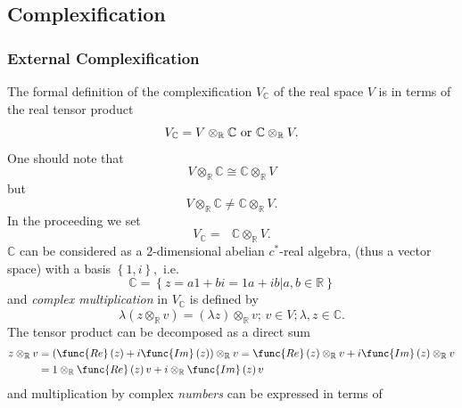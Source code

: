 \documentclass[aps,preprint]{revtex4}
\begin{document}
\subsection{Complexification \label{3/8/2026}}

\subsubsection{External Complexification}

The formal definition of the complexification $V_{\mathbb{C}}$ of the real
space $V$ is in terms of the real tensor product 
\begin{equation}
V_{\mathbb{C}}=V\otimes_{\mathbb{R}}\mathbb{C}\text{ or }\mathbb{C}\otimes_{%
\mathbb{R}}V.
\end{equation}
One should note that 
\begin{equation}
V\otimes_{\mathbb{R}}\mathbb{C\cong C}\otimes_{\mathbb{R}}V
\end{equation}
but 
\begin{equation}
V\otimes_{\mathbb{R}}\mathbb{C\neq C}\otimes_{\mathbb{R}}V.
\end{equation}
In the proceeding we set 
\begin{equation}
V_{\mathbb{C}}=\text{ }\mathbb{C}\otimes_{\mathbb{R}}V.
\end{equation}
$\mathbb{C}$ can be considered as a $2$-dimensional abelian $c^{\ast}$-real
algebra, (thus a vector space) with a basis $\left\{ 1,i\right\} ,$ i.e. 
\begin{equation}
\mathbb{C}=\left\{ \left. z=a1+bi=1a+ib\right\vert a,b\in\mathbb{R}\right\}
\end{equation}
and \emph{complex multiplication} in $V_{\mathbb{C}}$ is defined by%
\begin{equation}
\lambda\left( z\otimes_{\mathbb{R}}v\right) =\left( \lambda z\right)
\otimes_{\mathbb{R}}v;\,v\in V;\lambda,z\in\mathbb{C}.
\end{equation}
The tensor product can be decomposed as a direct sum 
\begin{align}
z\otimes_{\mathbb{R}}v & =\left( \func{Re}\left( z\right) +i\func{Im}\left(
z\right) \right) \otimes_{\mathbb{R}}v=\func{Re}\left( z\right) \otimes_{%
\mathbb{R}}v+i\func{Im}\left( z\right) \otimes_{\mathbb{R}}v \\
& =1\otimes_{\mathbb{R}}\func{Re}\left( z\right) v+i\otimes _{\mathbb{R}}%
\func{Im}\left( z\right) v
\end{align}
and multiplication by complex \emph{numbers} can be expressed in terms of
\end{document}
